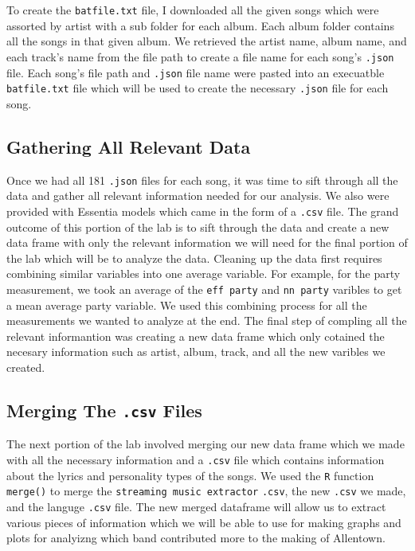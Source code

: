 \documentclass{article}\usepackage[]{graphicx}\usepackage[]{xcolor}
\begin{document}
\begin{multicols}{2}
To create the \texttt{batfile.txt} file, I downloaded all the given songs which were assorted by artist with a sub folder for each album. Each album folder contains all the songs in that given album. We retrieved the artist name, album name, and each track's name from the file path to create a file name for each song's \texttt{.json} file. Each song's file path and \texttt{.json} file name were pasted into an execuatble \texttt{batfile.txt} file which will be used to create the necessary \texttt{.json} file for each song.

\subsection{Gathering All Relevant Data}
Once we had all 181 \texttt{.json} files for each song, it was time to sift through all the data and gather all relevant information needed for our analysis. We also were provided with Essentia models which came in the form of a \texttt{.csv} file. The grand outcome of this portion of the lab is to sift through the data and create a new data frame with only the relevant information we will need for the final portion of the lab which will be to analyze the data. Cleaning up the data first requires combining similar variables into one average variable. For example, for the party measurement, we took an average of the \texttt{eff party} and \texttt{nn party} varibles to get a mean average party variable. We used this combining process for all the measurements we wanted to analyze at the end. The final step of compling all the relevant informantion was creating a new data frame which only cotained the necesary information such as artist, album, track, and all the new varibles we created.

\subsection{Merging The \texttt{.csv} Files}
The next portion of the lab involved merging our new data frame which we made with all the necessary information and a \texttt{.csv} file which contains information about the lyrics and personality types of the songs. We used the \texttt{R} function \texttt{merge()} to merge the \texttt{streaming music extractor} \texttt{.csv}, the new \texttt{.csv} we made, and the languge \texttt{.csv} file. The new merged dataframe will allow us to extract various pieces of information which we will be able to use for making graphs and plots for analyizng which band contributed more to the making of Allentown.


\end{multicols}
\end{document}
